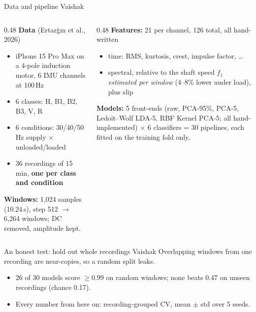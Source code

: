 \documentclass[aspectratio=169,11pt]{beamer}
\newcommand{\who}[1]{\hfill{\footnotesize\color{gray}#1}}
\newcommand{\tabfile}[1]{}
\begin{document}
\begin{frame}{Data and pipeline \who{Vaishak}}
  \begin{columns}[T]
    \begin{column}{0.48\textwidth}
      \textbf{Data} (Ertar\u{g}{\i}n et al., 2026)
      \begin{itemize}
        \item iPhone 15 Pro Max on a 4-pole induction motor, 6 IMU channels at 100\,Hz
        \item 6 classes: H, B1, B2, B3, V, R
        \item 6 conditions: 30/40/50\,Hz supply $\times$ unloaded/loaded
        \item 36 recordings of 15 min, \textbf{one per class and condition}
      \end{itemize}
      \textbf{Windows:} 1{,}024 samples (10.24\,s), step 512 $\to$ 6{,}264 windows;
      DC removed, amplitude kept.
    \end{column}
    \begin{column}{0.48\textwidth}
      \textbf{Features:} 21 per channel, 126 total, all hand-written
      \begin{itemize}
        \item time: RMS, kurtosis, crest, impulse factor, \dots
        \item spectral, relative to the shaft speed $f_1$ \emph{estimated per window}
              (4--8\% lower under load), plus slip
      \end{itemize}
      \textbf{Models:} 5 front-ends (raw, PCA-95\%, PCA-5, Ledoit--Wolf LDA-5, RBF Kernel
      PCA-5; all hand-implemented) $\times$ 6 classifiers = 30 pipelines, each fitted on the
      training fold only.
    \end{column}
  \end{columns}
\end{frame}

\begin{frame}{An honest test: hold out whole recordings \who{Vaishak}}
  Overlapping windows from one recording are near-copies, so a random split leaks.
  \vspace{0.6em}
  \begin{center}\tabfile{tab_splits.tex}\end{center}
  \vspace{0.6em}
  \begin{itemize}
    \item 26 of 30 models score $\ge 0.99$ on random windows; none beats 0.47 on unseen
          recordings (chance 0.17).
    \item Every number from here on: recording-grouped CV, mean $\pm$ std over 5 seeds.
  \end{itemize}
\end{frame}
\end{document}
